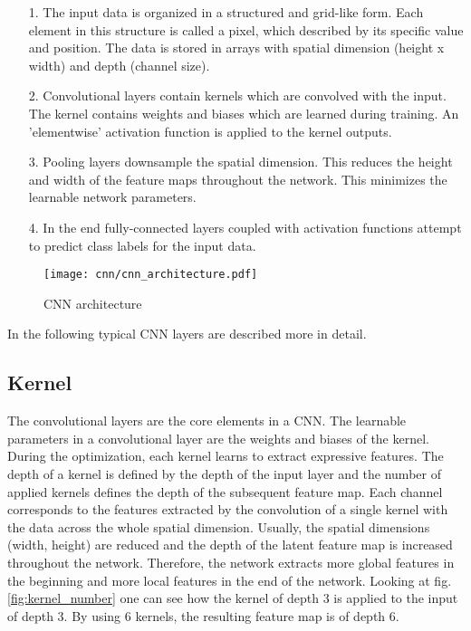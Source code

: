 \begin{itemize}
    \item [1.] The input data is organized in a structured and grid-like form. Each element in this structure is called a pixel, which described by its specific value and position. The data is stored in arrays with spatial dimension (height x width) and depth (channel size).
    
    \item [2.] Convolutional layers contain kernels which are convolved with the input. The kernel contains weights and biases which are learned during training. An 'elementwise' activation function is applied to the kernel outputs.
    
    \item [3.]  Pooling layers downsample the spatial dimension. This reduces the height and width of the feature maps throughout the network. This minimizes the learnable network parameters.
    
    \item [4.] In the end fully-connected layers coupled with activation functions attempt to predict class labels for the input data.
\end{itemize}

\begin{figure}[H]
  \centering
  \texttt{[image: cnn/cnn\_architecture.pdf]}
  \caption {CNN architecture}
  \label{fig:CNN_overview}
\end{figure}

In the following typical CNN layers are described more in detail. 

\subsection{Kernel}
The convolutional layers are the core elements in a CNN. The learnable parameters in a convolutional layer are the weights and biases of the kernel. During the optimization, each kernel learns to extract expressive features. The depth of a kernel is defined by the depth of the input layer and the number of applied kernels defines the depth of the subsequent feature map. Each channel corresponds to the features extracted by the convolution of a single kernel with the data across the whole spatial dimension. Usually, the spatial dimensions (width, height) are reduced and the depth of the latent feature map is increased throughout the network. Therefore, the network extracts more global features in the beginning and more local features in the end of the network. Looking at fig. \ref{fig:kernel_number} one can see how the kernel of depth 3 is applied to the input of depth 3. By using 6 kernels, the resulting feature map is of depth 6.

